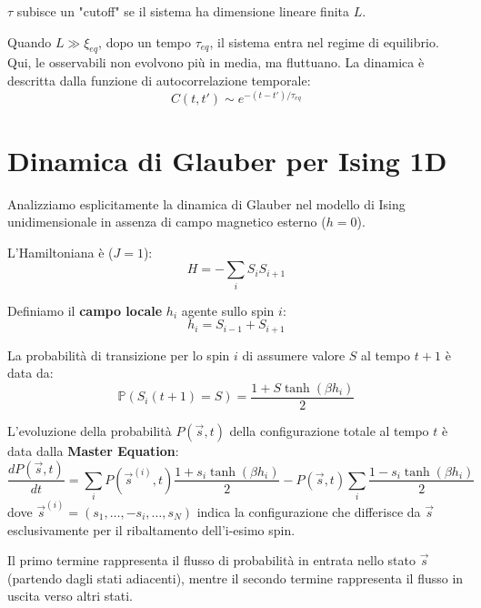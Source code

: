 $\tau$ subisce un "cutoff" se il sistema ha dimensione lineare finita $L$. 

\noindent Quando $L \gg \xi_{eq}$, dopo un tempo $\tau_{eq}$, il sistema entra nel regime di equilibrio. Qui, le osservabili non evolvono più in media, ma fluttuano. La dinamica è descritta dalla funzione di autocorrelazione temporale:
\begin{equation}
    C(t, t') \sim e^{-(t-t')/\tau_{eq}}
\end{equation}



\section{Dinamica di Glauber per Ising 1D}
Analizziamo esplicitamente la dinamica di Glauber nel modello di Ising unidimensionale in assenza di campo magnetico esterno ($h=0$). 

\noindent L'Hamiltoniana è ($J=1$):
\begin{equation}
    H = - \sum_i S_i S_{i+1}
\end{equation}

\noindent Definiamo il \textbf{campo locale} $h_i$ agente sullo spin $i$:
\begin{equation}
    h_i = S_{i-1} + S_{i+1}
\end{equation}

\noindent La probabilità di transizione per lo spin $i$ di assumere valore $S$ al tempo $t+1$ è data da:
\begin{equation}
    \mathbb{P}(S_i(t+1) = S) = \frac{1 + S \tanh(\beta h_i)}{2}
\end{equation}


\noindent L'evoluzione della probabilità $P(\vec{s}, t)$ della configurazione totale al tempo $t$ è data dalla \textbf{Master Equation}:
\begin{equation}
\frac{d P(\vec{s}, t)}{dt} = \sum_{i} P(\vec{s}^{(i)}, t) \frac{1 + s_i \tanh(\beta h_i)}{2} - P(\vec{s}, t) \sum_{i} \frac{1 - s_i \tanh(\beta h_i)}{2}
\end{equation}
dove $\vec{s}^{(i)} = (s_1, \dots, -s_i, \dots, s_N)$ indica la configurazione che differisce da $\vec{s}$ esclusivamente per il ribaltamento dell'i-esimo spin. 

\noindent Il primo termine rappresenta il flusso di probabilità in entrata nello stato $\vec{s}$ (partendo dagli stati adiacenti), mentre il secondo termine rappresenta il flusso in uscita verso altri stati.

